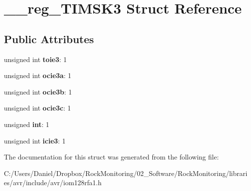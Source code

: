 \hypertarget{struct____reg___t_i_m_s_k3}{}\section{\+\_\+\+\_\+reg\+\_\+\+T\+I\+M\+S\+K3 Struct Reference}
\label{struct____reg___t_i_m_s_k3}
\subsection*{Public Attributes}
\begin{DoxyCompactItemize}
\item 
unsigned int {\bfseries toie3}\+: 1\hypertarget{struct____reg___t_i_m_s_k3_a60afa9f6b3405aa724bcccfbd5dce282}{}\label{struct____reg___t_i_m_s_k3_a60afa9f6b3405aa724bcccfbd5dce282}

\item 
unsigned int {\bfseries ocie3a}\+: 1\hypertarget{struct____reg___t_i_m_s_k3_aa2cad453a3889bfeed2492489f05c1eb}{}\label{struct____reg___t_i_m_s_k3_aa2cad453a3889bfeed2492489f05c1eb}

\item 
unsigned int {\bfseries ocie3b}\+: 1\hypertarget{struct____reg___t_i_m_s_k3_a5b80e423597527723c2fdbeac3ec68cf}{}\label{struct____reg___t_i_m_s_k3_a5b80e423597527723c2fdbeac3ec68cf}

\item 
unsigned int {\bfseries ocie3c}\+: 1\hypertarget{struct____reg___t_i_m_s_k3_aa834788e7993d7c322fb09ad3521b188}{}\label{struct____reg___t_i_m_s_k3_aa834788e7993d7c322fb09ad3521b188}

\item 
unsigned {\bfseries int}\+: 1\hypertarget{struct____reg___t_i_m_s_k3_afefb2bacc03a9663484c607e573fba8f}{}\label{struct____reg___t_i_m_s_k3_afefb2bacc03a9663484c607e573fba8f}

\item 
unsigned int {\bfseries icie3}\+: 1\hypertarget{struct____reg___t_i_m_s_k3_a0957a11044eba6c260ce10a633df4a87}{}\label{struct____reg___t_i_m_s_k3_a0957a11044eba6c260ce10a633df4a87}

\end{DoxyCompactItemize}


The documentation for this struct was generated from the following file\+:\begin{DoxyCompactItemize}
\item 
C\+:/\+Users/\+Daniel/\+Dropbox/\+Rock\+Monitoring/02\+\_\+\+Software/\+Rock\+Monitoring/libraries/avr/include/avr/iom128rfa1.\+h\end{DoxyCompactItemize}

